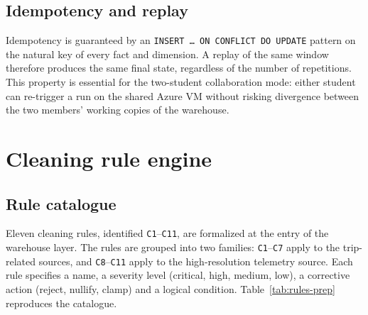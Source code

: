 \subsection{Idempotency and replay}
Idempotency is guaranteed by an \texttt{INSERT~\dots~ON~CONFLICT~DO~UPDATE} pattern on the natural key of every fact and dimension. A replay of the same window therefore produces the same final state, regardless of the number of repetitions. This property is essential for the two-student collaboration mode: either student can re-trigger a run on the shared Azure VM without risking divergence between the two members' working copies of the warehouse.

\section{Cleaning rule engine}

\subsection{Rule catalogue}
Eleven cleaning rules, identified \texttt{C1}--\texttt{C11}, are formalized at the entry of the warehouse layer. The rules are grouped into two families: \texttt{C1}--\texttt{C7} apply to the trip-related sources, and \texttt{C8}--\texttt{C11} apply to the high-resolution telemetry source. Each rule specifies a name, a severity level (critical, high, medium, low), a corrective action (reject, nullify, clamp) and a logical condition. Table~\ref{tab:rules-prep} reproduces the catalogue.

